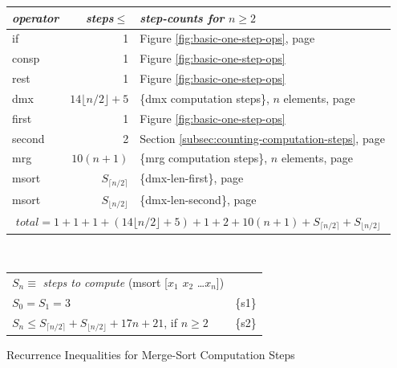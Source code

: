 \begin{figure}
\begin{center}
\begin{spacing}{0.9}
\begin{tabular}{lrl}
  \emph{operator} & \emph{steps}$\leq$ & \emph{step-counts for} $n \geq 2$\\
  \hline
   \textsf{if}     & 1 & Figure \ref{fig:basic-one-step-ops}, page \pageref{fig:basic-one-step-ops}  \\
   \textsf{consp}  & 1 & Figure \ref{fig:basic-one-step-ops}  \\
   \textsf{rest}   & 1 & Figure \ref{fig:basic-one-step-ops} \\
   \textsf{dmx}    & $14\lfloor n/2\rfloor + 5$ & \{dmx computation steps\}, $n$ elements, page \pageref{fig:dmx-computation-time}\\
   \textsf{first}  & 1 & Figure \ref{fig:basic-one-step-ops} \\
   \textsf{second} & 2 & Section \ref{subsec:counting-computation-steps}, page \pageref{steps-in-second-op} \\
   \textsf{mrg}    & $10(n+1)$ & \{mrg computation steps\}, $n$ elements, page \pageref{thm:mrg-computation-time}\\
   \textsf{msort}  & $S_{\lceil  n/2 \rceil}$  & \{dmx-len-first\}, page \pageref{thm:dmx-length-first-second} \\
   \textsf{msort}  & $S_{\lfloor n/2 \rfloor}$ & \{dmx-len-second\}, page \pageref{thm:dmx-length-first-second} \vspace{5pt} \\
   \hline
	\multicolumn{3}{c}{$total = 1+1+1+(14\lfloor n/2\rfloor+5)+1+2+10(n+1)+S_{\lceil n/2\rceil}+S_{\lfloor n/2\rfloor}$} \vspace{1pt} \\
   \hline
\end{tabular}
\end{spacing}
~\vspace{2mm}\\
\begin{tabular}{ll}
   $S_n \equiv$ \emph{steps to compute} \textsf{(msort [$x_1$ $x_2$ \dots $x_n$])} \\
   $S_0 = S_1 = 3$ & \{s1\}\\
   $S_{n} \leq S_{\lceil n/2 \rceil} + S_{\lfloor n/2 \rfloor} + 17n + 21$, if $n \geq 2$ & \{s2\}\\
\end{tabular}
\end{center}
\caption{Recurrence Inequalities for Merge-Sort Computation Steps}
\label{msort-recurrences}
\end{figure}

